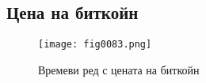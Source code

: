 \subsection{Цена на биткойн}

\begin{figure}[H]
  \centering
  \texttt{[image: fig0083.png]}
  \caption{Времеви ред с цената на биткойн}
\label{fig0083}
\end{figure}

%
%
%
%
%
%
%
